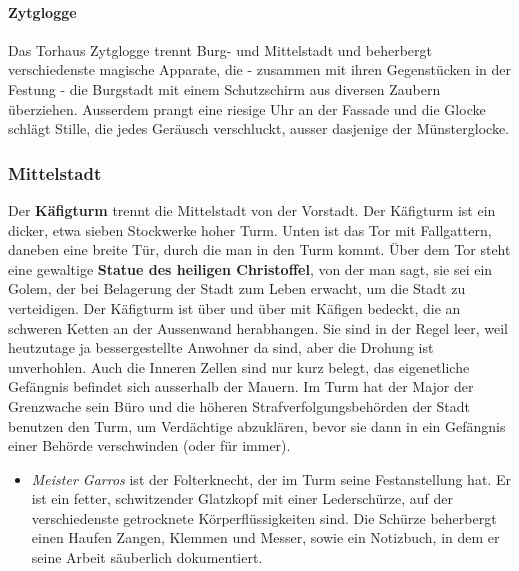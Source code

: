 \documentclass[10pt,twoside,twocolumn,openany]{book}
\begin{document}
\begin{multicols}{2}
	\paragraph{Zytglogge} Das Torhaus Zytglogge trennt Burg- und Mittelstadt und beherbergt verschiedenste magische Apparate, die - zusammen mit ihren Gegenstücken in der Festung - die Burgstadt mit einem Schutzschirm aus diversen Zaubern überziehen. Ausserdem prangt eine riesige Uhr an der Fassade und die Glocke schlägt Stille, die jedes Geräusch verschluckt, ausser dasjenige der Münsterglocke.
	
	\subsubsection{Mittelstadt}
	Der \textbf{Käfigturm} trennt die Mittelstadt von der Vorstadt. Der Käfigturm ist ein dicker, etwa sieben Stockwerke hoher Turm. Unten ist das Tor mit Fallgattern, daneben eine breite Tür, durch die man in den Turm kommt. Über dem Tor steht eine gewaltige \textbf{Statue des heiligen Christoffel}, von der man sagt, sie sei ein Golem, der bei Belagerung der Stadt zum Leben erwacht, um die Stadt zu verteidigen. Der Käfigturm ist über und über mit Käfigen bedeckt, die an schweren Ketten an der Aussenwand herabhangen. Sie sind in der Regel leer, weil heutzutage ja bessergestellte Anwohner da sind, aber die Drohung ist unverhohlen. Auch die Inneren Zellen sind nur kurz belegt, das eigenetliche Gefängnis befindet sich ausserhalb der Mauern.
	Im Turm hat der Major der Grenzwache sein Büro und die höheren Strafverfolgungsbehörden der Stadt benutzen den Turm, um Verdächtige abzuklären, bevor sie dann in ein Gefängnis einer Behörde verschwinden (oder für immer).
	\begin{itemize}
		\item \textit{Meister Garros} ist der Folterknecht, der im Turm seine Festanstellung hat. Er ist ein fetter, schwitzender Glatzkopf mit einer Lederschürze, auf der verschiedenste getrocknete Körperflüssigkeiten sind. Die Schürze beherbergt einen Haufen Zangen, Klemmen und Messer, sowie ein Notizbuch, in dem er seine Arbeit säuberlich dokumentiert.
	\end{itemize}
	
\end{multicols}
\end{document}
